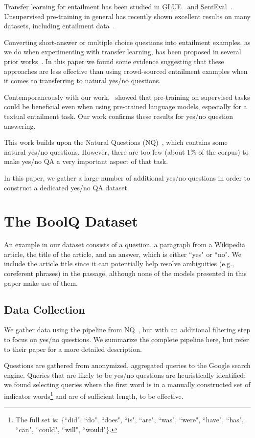 Transfer learning for entailment has been studied in GLUE~\cite{glue} and SentEval~\cite{senteval}. Unsupervised pre-training in general has recently shown excellent results on many datasets, including entailment data~\cite{elmo, bert, openai}.

Converting short-answer or multiple choice questions into entailment examples, as we do when experimenting with transfer learning, has been proposed in several prior works~\cite{demszky2018transforming, poliak2018collecting, scitail}. In this paper we found some evidence suggesting that these approaches are less effective than using crowd-sourced entailment examples when it comes to transferring to natural yes/no questions.

Contemporaneously with our work,~\citet{phang2018sentence} showed that pre-training on supervised tasks could be beneficial even when using pre-trained language models, especially for a textual entailment task. Our work confirms these results for yes/no question answering.

This work builds upon the Natural Questions (NQ)~\cite{tnq}, which contains some natural yes/no questions. However, there are too few (about 1\% of the corpus) to make yes/no QA a very important aspect of that task.

In this paper, we gather a large number of additional yes/no questions in order to construct a dedicated yes/no QA dataset.

\section{The BoolQ Dataset} An example in our dataset consists of a question, a paragraph from a Wikipedia article, the title of the article, and an answer, which is either ``yes" or ``no". We include the article title since it can potentially help resolve ambiguities (e.g., coreferent phrases) in the passage, although none of the models presented in this paper make use of them.

\subsection{Data Collection}
\label{sect:data_collection}

We gather data using the pipeline from NQ~\cite{tnq}, but with an additional filtering step to focus on yes/no questions. We summarize the complete pipeline here, but refer to their paper for a more detailed description.

Questions are gathered from anonymized, aggregated queries to the Google search engine. Queries that are likely to be yes/no questions are heuristically identified: we found selecting queries where the first word is in a manually constructed set of indicator words\footnote{The full set is: \{``did", ``do", ``does", ``is", ``are", ``was",  ``were", ``have", ``has", ``can", ``could", ``will", ``would"\}.}
and are of sufficient length, to be effective.

